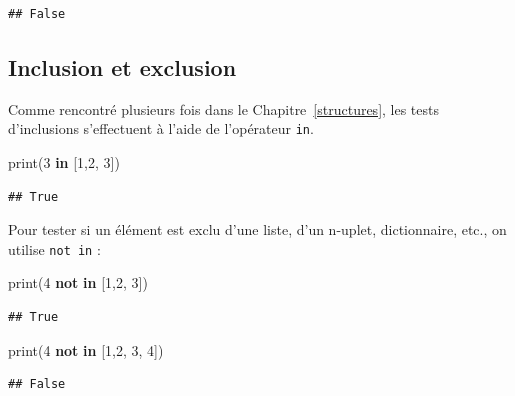 \documentclass[12pt,]{book}
\newenvironment{Shaded}{\begin{snugshade}}{\end{snugshade}}
\newcommand{\KeywordTok}[1]{\textcolor[rgb]{0.13,0.29,0.53}{\textbf{#1}}}
\newcommand{\DecValTok}[1]{\textcolor[rgb]{0.00,0.00,0.81}{#1}}
\newcommand{\BuiltInTok}[1]{#1}
\newcommand{\NormalTok}[1]{#1}
\numberwithin{equation}{section}
\numberwithin{countremarque}{section}
\begin{document}
\begin{lstlisting}
## False
\end{lstlisting}

\subsection{Inclusion et exclusion}\label{inclusion-et-exclusion}

Comme rencontré plusieurs fois dans le Chapitre~\ref{structures}, les
tests d'inclusions s'effectuent à l'aide de l'opérateur \texttt{in}.

\begin{Shaded}
\begin{Highlighting}[]
\BuiltInTok{print}\NormalTok{(}\DecValTok{3} \KeywordTok{in}\NormalTok{ [}\DecValTok{1}\NormalTok{,}\DecValTok{2}\NormalTok{, }\DecValTok{3}\NormalTok{])}
\end{Highlighting}
\end{Shaded}

\begin{lstlisting}
## True
\end{lstlisting}

Pour tester si un élément est exclu d'une liste, d'un n-uplet,
dictionnaire, etc., on utilise \texttt{not\ in} :

\begin{Shaded}
\begin{Highlighting}[]
\BuiltInTok{print}\NormalTok{(}\DecValTok{4} \KeywordTok{not} \KeywordTok{in}\NormalTok{ [}\DecValTok{1}\NormalTok{,}\DecValTok{2}\NormalTok{, }\DecValTok{3}\NormalTok{])}
\end{Highlighting}
\end{Shaded}

\begin{lstlisting}
## True
\end{lstlisting}

\begin{Shaded}
\begin{Highlighting}[]
\BuiltInTok{print}\NormalTok{(}\DecValTok{4} \KeywordTok{not} \KeywordTok{in}\NormalTok{ [}\DecValTok{1}\NormalTok{,}\DecValTok{2}\NormalTok{, }\DecValTok{3}\NormalTok{, }\DecValTok{4}\NormalTok{])}
\end{Highlighting}
\end{Shaded}

\begin{lstlisting}
## False
\end{lstlisting}
\end{document}
